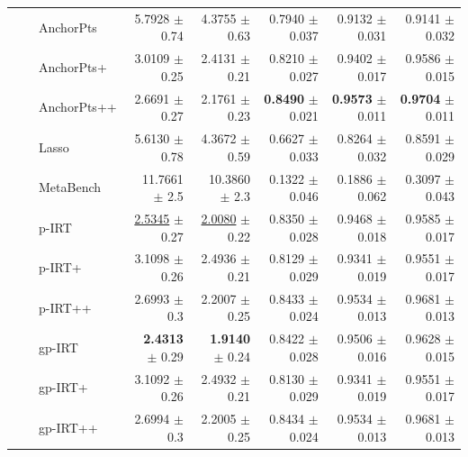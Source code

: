 \begin{longtable}{llp{}rrrrr}
 &  & AnchorPts & 5.7928 {\scriptsize $\pm$ 0.74} & 4.3755 {\scriptsize $\pm$ 0.63} & 0.7940 {\scriptsize $\pm$ 0.037} & 0.9132 {\scriptsize $\pm$ 0.031} & 0.9141 {\scriptsize $\pm$ 0.032} \\
 &  & AnchorPts+ & 3.0109 {\scriptsize $\pm$ 0.25} & 2.4131 {\scriptsize $\pm$ 0.21} & 0.8210 {\scriptsize $\pm$ 0.027} & 0.9402 {\scriptsize $\pm$ 0.017} & 0.9586 {\scriptsize $\pm$ 0.015} \\
 &  & AnchorPts++ & 2.6691 {\scriptsize $\pm$ 0.27} & 2.1761 {\scriptsize $\pm$ 0.23} & \textbf{0.8490} {\scriptsize $\pm$ 0.021} & \textbf{0.9573} {\scriptsize $\pm$ 0.011} & \textbf{0.9704} {\scriptsize $\pm$ 0.011} \\
 &  & Lasso & 5.6130 {\scriptsize $\pm$ 0.78} & 4.3672 {\scriptsize $\pm$ 0.59} & 0.6627 {\scriptsize $\pm$ 0.033} & 0.8264 {\scriptsize $\pm$ 0.032} & 0.8591 {\scriptsize $\pm$ 0.029} \\
 &  & MetaBench & 11.7661 {\scriptsize $\pm$ 2.5} & 10.3860 {\scriptsize $\pm$ 2.3} & 0.1322 {\scriptsize $\pm$ 0.046} & 0.1886 {\scriptsize $\pm$ 0.062} & 0.3097 {\scriptsize $\pm$ 0.043} \\
 &  & p-IRT & \underline{2.5345} {\scriptsize $\pm$ 0.27} & \underline{2.0080} {\scriptsize $\pm$ 0.22} & 0.8350 {\scriptsize $\pm$ 0.028} & 0.9468 {\scriptsize $\pm$ 0.018} & 0.9585 {\scriptsize $\pm$ 0.017} \\
 &  & p-IRT+ & 3.1098 {\scriptsize $\pm$ 0.26} & 2.4936 {\scriptsize $\pm$ 0.21} & 0.8129 {\scriptsize $\pm$ 0.029} & 0.9341 {\scriptsize $\pm$ 0.019} & 0.9551 {\scriptsize $\pm$ 0.017} \\
 &  & p-IRT++ & 2.6993 {\scriptsize $\pm$ 0.3} & 2.2007 {\scriptsize $\pm$ 0.25} & 0.8433 {\scriptsize $\pm$ 0.024} & 0.9534 {\scriptsize $\pm$ 0.013} & 0.9681 {\scriptsize $\pm$ 0.013} \\
 &  & gp-IRT & \textbf{2.4313} {\scriptsize $\pm$ 0.29} & \textbf{1.9140} {\scriptsize $\pm$ 0.24} & 0.8422 {\scriptsize $\pm$ 0.028} & 0.9506 {\scriptsize $\pm$ 0.016} & 0.9628 {\scriptsize $\pm$ 0.015} \\
 &  & gp-IRT+ & 3.1092 {\scriptsize $\pm$ 0.26} & 2.4932 {\scriptsize $\pm$ 0.21} & 0.8130 {\scriptsize $\pm$ 0.029} & 0.9341 {\scriptsize $\pm$ 0.019} & 0.9551 {\scriptsize $\pm$ 0.017} \\
 &  & gp-IRT++ & 2.6994 {\scriptsize $\pm$ 0.3} & 2.2005 {\scriptsize $\pm$ 0.25} & 0.8434 {\scriptsize $\pm$ 0.024} & 0.9534 {\scriptsize $\pm$ 0.013} & 0.9681 {\scriptsize $\pm$ 0.013} \\

\end{longtable}
